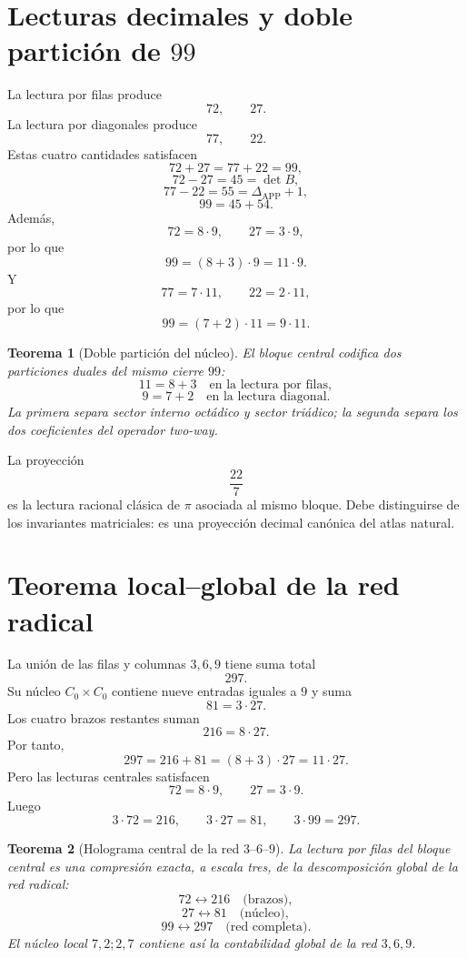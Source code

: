 \documentclass[11pt,a4paper]{article}
\newtheorem{teorema}{Teorema}
\newcommand{\APP}{\mathrm{APP}}
\begin{document}
\section{Lecturas decimales y doble partición de $99$}

La lectura por filas produce
\[
72,\qquad27.
\]
La lectura por diagonales produce
\[
77,\qquad22.
\]
Estas cuatro cantidades satisfacen
\[
\boxed{72+27=77+22=99,}
\]
\[
\boxed{72-27=45=\det B,}
\]
\[
\boxed{77-22=55=\Delta_{\APP}+1,}
\]
\[
\boxed{99=45+54.}
\]
Además,
\[
72=8\cdot9,
\qquad
27=3\cdot9,
\]
por lo que
\[
99=(8+3)\cdot9=11\cdot9.
\]
Y
\[
77=7\cdot11,
\qquad
22=2\cdot11,
\]
por lo que
\[
99=(7+2)\cdot11=9\cdot11.
\]

\begin{teorema}[Doble partición del núcleo]
El bloque central codifica dos particiones duales del mismo cierre $99$:
\[
11=8+3
\quad\text{en la lectura por filas},
\]
\[
9=7+2
\quad\text{en la lectura diagonal}.
\]
La primera separa sector interno octádico y sector triádico; la segunda separa los dos coeficientes del operador two-way.
\end{teorema}

La proyección
\[
\frac{22}{7}
\]
es la lectura racional clásica de $\pi$ asociada al mismo bloque. Debe distinguirse de los invariantes matriciales: es una proyección decimal canónica del atlas natural.

\section{Teorema local--global de la red radical}

La unión de las filas y columnas $3,6,9$ tiene suma total
\[
297.
\]
Su núcleo $C_0\times C_0$ contiene nueve entradas iguales a $9$ y suma
\[
81=3\cdot27.
\]
Los cuatro brazos restantes suman
\[
216=8\cdot27.
\]
Por tanto,
\[
\boxed{297=216+81=(8+3)\cdot27=11\cdot27.}
\]
Pero las lecturas centrales satisfacen
\[
72=8\cdot9,
\qquad
27=3\cdot9.
\]
Luego
\[
\boxed{3\cdot72=216,\qquad 3\cdot27=81,\qquad3\cdot99=297.}
\]

\begin{teorema}[Holograma central de la red $3$--$6$--$9$]
La lectura por filas del bloque central es una compresión exacta, a escala tres, de la descomposición global de la red radical:
\[
72\longleftrightarrow216\quad\text{(brazos)},
\]
\[
27\longleftrightarrow81\quad\text{(núcleo)},
\]
\[
99\longleftrightarrow297\quad\text{(red completa)}.
\]
El núcleo local $7,2;2,7$ contiene así la contabilidad global de la red $3,6,9$.
\end{teorema}
\end{document}
